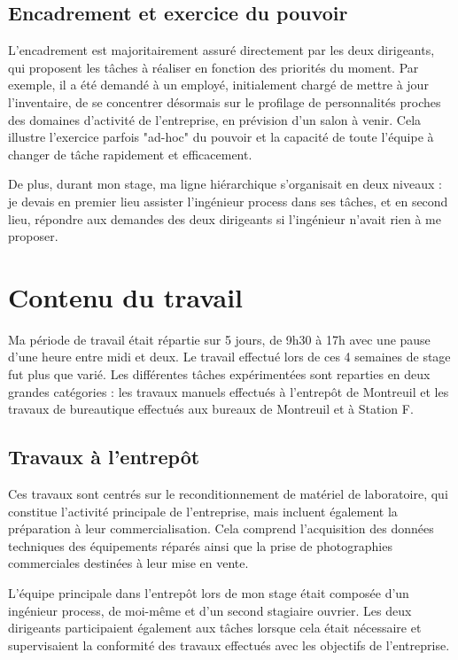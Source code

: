 \documentclass{rapportENSCP}
\begin{document}
\subsection{Encadrement et exercice du pouvoir}
L'encadrement est majoritairement assuré directement par les deux dirigeants, qui proposent les tâches à réaliser en fonction des priorités du moment. Par exemple, il a été demandé à un employé, initialement chargé de mettre à jour l'inventaire, de se concentrer désormais sur le profilage de personnalités proches des domaines d'activité de l'entreprise, en prévision d'un salon à venir. Cela illustre l'exercice parfois "ad-hoc" du pouvoir et la capacité de toute l'équipe à changer de tâche rapidement et efficacement.

De plus, durant mon stage, ma ligne hiérarchique s'organisait en deux niveaux : je devais en premier lieu assister l'ingénieur process dans ses tâches, et en second lieu, répondre aux demandes des deux dirigeants si l'ingénieur n'avait rien à me proposer.


\section{Contenu du travail}

Ma période de travail était répartie sur 5 jours, de 9h30 à 17h avec une pause d'une heure entre midi et deux.  Le travail effectué lors de ces 4 semaines de stage fut plus que varié. Les différentes tâches expérimentées sont reparties en deux grandes catégories : les travaux manuels effectués à l'entrepôt de Montreuil et les travaux de bureautique effectués aux bureaux de Montreuil et à Station F.

\subsection{Travaux à l'entrepôt}
Ces travaux sont centrés sur le reconditionnement de matériel de laboratoire, qui constitue l'activité principale de l'entreprise, mais incluent également la préparation à leur commercialisation. Cela comprend l'acquisition des données techniques des équipements réparés ainsi que la prise de photographies commerciales destinées à leur mise en vente.

L'équipe principale dans l'entrepôt lors de mon stage était composée d'un ingénieur process, de moi-même et d'un second stagiaire ouvrier. Les deux dirigeants participaient également aux tâches lorsque cela était nécessaire et supervisaient la conformité des travaux effectués avec les objectifs de l'entreprise.
\end{document}
